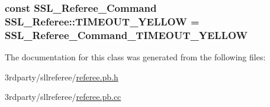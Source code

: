 \hypertarget{class_s_s_l___referee_a6e20cd495032930ca7f87c82b7166e38}{
\subsubsection[{T\-I\-M\-E\-O\-U\-T\-\_\-\-Y\-E\-L\-L\-O\-W}]{\setlength{\rightskip}{0pt plus 5cm}const {\bf S\-S\-L\-\_\-\-Referee\-\_\-\-Command} S\-S\-L\-\_\-\-Referee\-::\-T\-I\-M\-E\-O\-U\-T\-\_\-\-Y\-E\-L\-L\-O\-W = {\bf S\-S\-L\-\_\-\-Referee\-\_\-\-Command\-\_\-\-T\-I\-M\-E\-O\-U\-T\-\_\-\-Y\-E\-L\-L\-O\-W}\hspace{0.3cm}{\ttfamily [static]}}}\label{class_s_s_l___referee_a6e20cd495032930ca7f87c82b7166e38}


The documentation for this class was generated from the following files\-:\begin{DoxyCompactItemize}
\item 
3rdparty/sllreferee/\hyperlink{referee_8pb_8h}{referee.\-pb.\-h}\item 
3rdparty/sllreferee/\hyperlink{referee_8pb_8cc}{referee.\-pb.\-cc}\end{DoxyCompactItemize}
